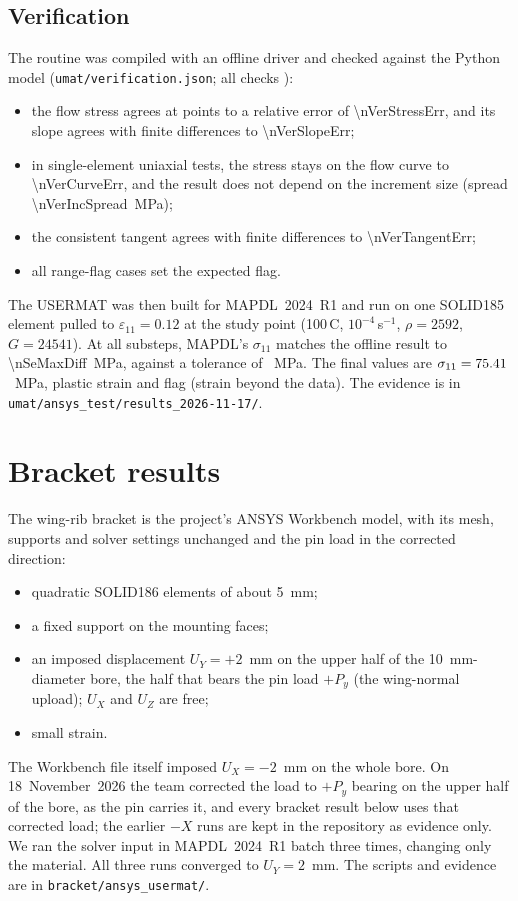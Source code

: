 \documentclass[11pt,a4paper]{article}
\newcommand{\file}[1]{\nolinkurl{#1}}
\begin{document}
\subsection{Verification}
The routine was compiled with an offline driver and checked against the Python model (\file{umat/verification.json}; all checks \nVerPassed):
\begin{itemize}
\item the flow stress agrees at \nVerFlowPoints{} points to a relative error of \num{\nVerStressErr}, and its slope agrees with finite differences to \num{\nVerSlopeErr};
\item in single-element uniaxial tests, the stress stays on the flow curve to \num{\nVerCurveErr}, and the result does not depend on the increment size (spread \num{\nVerIncSpread}~MPa);
\item the consistent tangent agrees with finite differences to \num{\nVerTangentErr};
\item all \nVerFlagChecks{} range-flag cases set the expected flag.
\end{itemize}
The USERMAT was then built for MAPDL~2024~R1 and run on one SOLID185 element pulled to $\varepsilon_{11}=0.12$ at the study point (100\,\textdegree C, $10^{-4}$\,s$^{-1}$, $\rho=2592$, $G=24541$). At all \nSePoints{} substeps, MAPDL's $\sigma_{11}$ matches the offline result to \num{\nSeMaxDiff}~MPa, against a tolerance of \nSeTol~MPa. The final values are $\sigma_{11}=75.41$~MPa, plastic strain \nSeEqpsFinal{} and flag \nSeFlagFinal{} (strain beyond the data). The evidence is in \file{umat/ansys_test/results_2026-11-17/}.

\section{Bracket results}
\label{sec:bracket}
The wing-rib bracket is the project's ANSYS Workbench model, with its mesh, supports and solver settings unchanged and the pin load in the corrected direction:
\begin{itemize}
\item \nMeshElemCoarse{} quadratic SOLID186 elements of about 5~mm;
\item a fixed support on the mounting faces;
\item an imposed displacement $U_Y=+2$~mm on the upper half of the 10~mm-diameter bore, the half that bears the pin load $+P_y$ (the wing-normal upload); $U_X$ and $U_Z$ are free;
\item small strain.
\end{itemize}
The Workbench file itself imposed $U_X=-2$~mm on the whole bore. On 18~November~2026 the team corrected the load to $+P_y$ bearing on the upper half of the bore, as the pin carries it, and every bracket result below uses that corrected load; the earlier $-X$ runs are kept in the repository as evidence only. We ran the solver input in MAPDL~2024~R1 batch three times, changing only the material. All three runs converged to $U_Y=2$~mm. The scripts and evidence are in \file{bracket/ansys_usermat/}.
\end{document}
